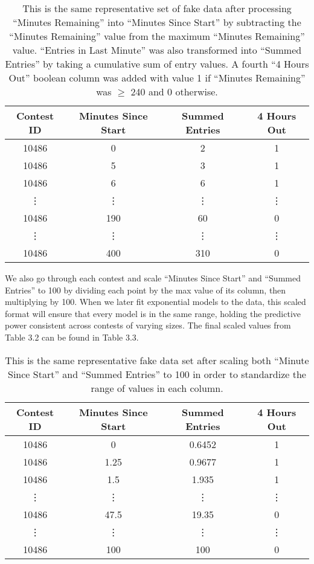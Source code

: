 \begin{table}
\begin{center}
\begin{tabular}{| c | c | c | c |}
\hline
 \textbf{Contest ID} & \textbf{Minutes Since Start} & \textbf{Summed Entries} & \textbf{4 Hours Out} \\ 
 \hline
 10486 & 0 & 2 & 1 \\  
 \hline
 10486 & 5 & 3 & 1 \\
 \hline
 10486 & 6 & 6 & 1 \\
 \hline
 \vdots & \vdots & \vdots & \vdots \\
 \hline
 10486 & 190 & 60 & 0 \\
 \hline
 \vdots & \vdots & \vdots & \vdots \\
 \hline
 10486 & 400 & 310 & 0 \\
 \hline
\end{tabular}
\caption{This is the same representative set of fake data after processing ``Minutes Remaining'' into ``Minutes Since Start'' by subtracting the ``Minutes Remaining'' value from the maximum ``Minutes Remaining'' value. ``Entries in Last Minute'' was also transformed into ``Summed Entries'' by taking a cumulative sum of entry values. A fourth ``4 Hours Out'' boolean column was added with value 1 if ``Minutes Remaining'' was $\geq$ 240 and 0 otherwise.}
\end{center}
\end{table}

We also go through each contest and scale ``Minutes Since Start'' and ``Summed Entries'' to 100 by dividing each point by the max value of its column, then multiplying by 100. When we later fit exponential models to the data, this scaled format will ensure that every model is in the same range, holding the predictive power consistent across contests of varying sizes.  The final scaled values from Table 3.2 can be found in Table 3.3.

\begin{table}
\begin{center}
\begin{tabular}{| c | c | c | c |}
\hline
 \textbf{Contest ID} & \textbf{Minutes Since Start} & \textbf{Summed Entries} & \textbf{4 Hours Out} \\ 
 \hline
 10486 & 0 & 0.6452 & 1 \\  
 \hline
 10486 & 1.25 & 0.9677 & 1 \\
 \hline
 10486 & 1.5 & 1.935 & 1 \\
 \hline
 \vdots & \vdots & \vdots & \vdots \\
 \hline
 10486 & 47.5 & 19.35 & 0 \\
 \hline
 \vdots & \vdots & \vdots & \vdots \\
 \hline
 10486 & 100 & 100 & 0 \\
 \hline
\end{tabular}
\caption{This is the same representative fake data set after scaling both ``Minute Since Start'' and ``Summed Entries'' to 100 in order to standardize the range of values in each column.}
\end{center}
\end{table}

